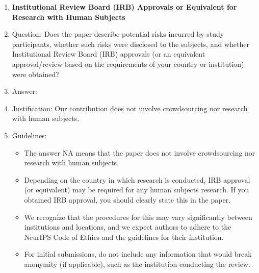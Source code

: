 \begin{enumerate}
\item {\bf Institutional Review Board (IRB) Approvals or Equivalent for Research with Human Subjects}
    \item[] Question: Does the paper describe potential risks incurred by study participants, whether such risks were disclosed to the subjects, and whether Institutional Review Board (IRB) approvals (or an equivalent approval/review based on the requirements of your country or institution) were obtained?
    \item[] Answer: \answerNA{}
    \item[] Justification: Our contribution does not involve crowdsourcing nor research with human subjects.
    \item[] Guidelines:
    \begin{itemize}
        \item The answer NA means that the paper does not involve crowdsourcing nor research with human subjects.
        \item Depending on the country in which research is conducted, IRB approval (or equivalent) may be required for any human subjects research. If you obtained IRB approval, you should clearly state this in the paper. 
        \item We recognize that the procedures for this may vary significantly between institutions and locations, and we expect authors to adhere to the NeurIPS Code of Ethics and the guidelines for their institution. 
        \item For initial submissions, do not include any information that would break anonymity (if applicable), such as the institution conducting the review.
    \end{itemize}

\end{enumerate}
